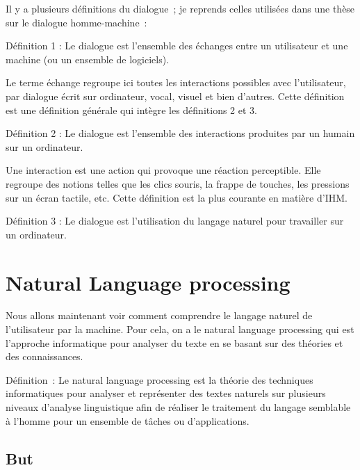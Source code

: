 	Il y a plusieurs définitions du dialogue ;  je reprends celles utilisées dans une thèse sur le dialogue homme-machine :
	\vspace{1em}
	
Définition 1 : Le dialogue est l'ensemble des échanges entre un utilisateur et une machine (ou un ensemble de logiciels). \cite{ref7}
\vspace{1em}

	Le terme échange regroupe ici toutes les interactions possibles avec l’utilisateur, par dialogue écrit sur ordinateur, vocal, visuel et bien d’autres. Cette définition est une définition générale qui intègre les définitions 2 et 3. 
\vspace{1em}

Définition 2 : Le dialogue est l'ensemble des interactions produites par un humain sur un ordinateur. \cite{ref7}
\vspace{1em}

	Une interaction est une action qui provoque une réaction perceptible. Elle regroupe des notions telles que les clics souris, la frappe de touches, les pressions sur un écran tactile, etc.  Cette définition est la plus courante en matière d'IHM.
\vspace{1em}

Définition 3 : Le dialogue est l'utilisation du langage naturel pour travailler sur un ordinateur. \cite{ref7}
\vspace{1em}

\section{Natural Language processing}

Nous allons maintenant voir comment comprendre le langage naturel de l’utilisateur par la machine. Pour cela, on a le natural language  processing qui est l’approche informatique pour analyser du texte en se basant sur des théories et des connaissances.
\vspace{1em}

Définition : Le natural language processing est la théorie des techniques informatiques pour analyser et représenter des textes naturels sur plusieurs niveaux d'analyse linguistique afin de réaliser le traitement du langage semblable à l'homme pour un ensemble de tâches ou d’applications.
\vspace{1em}


\subsection{But}


